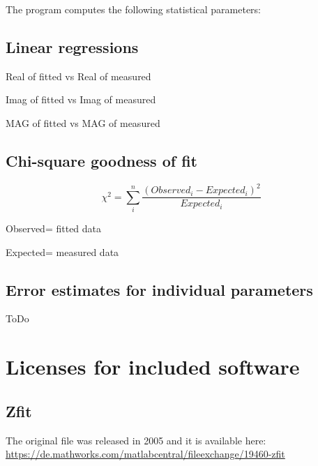 \documentclass[10pt,a4paper,oneside]{book}
\begin{document}
The program computes the following statistical parameters:

\section{Linear regressions}

Real of fitted vs Real of measured

Imag of fitted vs Imag of measured

MAG of fitted vs MAG of measured

\section{Chi-square goodness of fit}

\[ \chi^2 = \sum_i^n{\dfrac{(Observed_i-Expected_i)^2}{Expected_i}} \]

Observed= fitted data

Expected= measured data

\section{Error estimates for individual parameters}

ToDo


\newpage{}
\chapter{Licenses for included software}

\section{Zfit}

The original file was released in 2005 and it is available here:\\

\url{https://de.mathworks.com/matlabcentral/fileexchange/19460-zfit}
\end{document}
